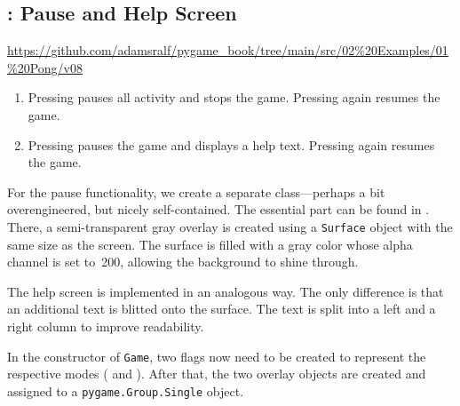 \subsection{: Pause and Help Screen}
\begin{diskbox}
	\url{https://github.com/adamsralf/pygame_book/tree/main/src/02%20Examples/01%20Pong/v08}
\end{diskbox}
\begin{enumerate}
	\item Pressing  pauses all activity and stops the game.  
	Pressing  again resumes the game.\label{req0201PauseHelp1}
	
	\item Pressing  pauses the game and displays a help text.  
	Pressing  again resumes the game.\label{req0201PauseHelp2}
\end{enumerate}
\er

For the pause functionality, we create a separate class—perhaps a bit overengineered, but nicely self-contained. The essential part can be found in . There, a semi-transparent gray overlay is created using a \texttt{Surface} object with the same size as the screen. The surface is filled with a gray color whose alpha channel is set to~200, allowing the background to shine through.


The help screen is implemented in an analogous way. The only difference is that an additional text is blitted onto the surface. The text is split into a left and a right column to improve readability.


In the constructor of \texttt{Game}, two flags now need to be created to represent the respective modes ( and ). After that, the two overlay objects are created and assigned to a \texttt{pygame.Group.Single} object.



